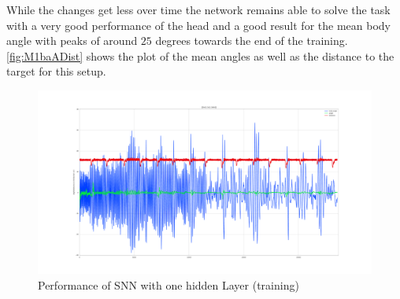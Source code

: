 While the changes get less over time the network remains able to solve the task with a very good performance of the head and a good result for the mean body angle with peaks of around $25$ degrees towards the end of the training. \autoref{fig:M1baADist} shows the plot of the mean angles as well as the distance to the target for this setup.
\begin{figure}[htpb]
  \centering
  \includegraphics[width=\textwidth]{figures/plots/M1baADist}
  \caption{ Performance of SNN with one hidden Layer (training)  }
  \label{fig:M1baADist}
\end{figure}

